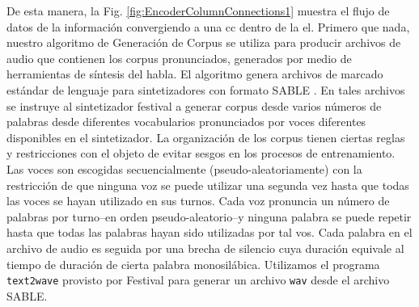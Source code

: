 {De esta manera, la Fig. \ref{fig:EncoderColumnConnections1} muestra el flujo de datos de la información convergiendo a una \gls{cc} dentro de la \gls{el}.
Primero que nada, nuestro algoritmo de Generación de Corpus se utiliza para producir archivos de audio que contienen los corpus pronunciados, generados por medio de herramientas de síntesis del habla.
El algoritmo genera archivos de marcado estándar de lenguaje para sintetizadores con formato SABLE \cite{sable}.
En tales archivos se instruye al sintetizador \gls{festival} a generar corpus desde varios números de palabras desde diferentes vocabularios pronunciados por voces diferentes disponibles en el sintetizador. 
La organización de los corpus tienen ciertas reglas y restricciones con el objeto de evitar sesgos en los procesos de entrenamiento.
Las voces son escogidas secuencialmente (pseudo-aleatoriamente) con la restricción de que ninguna voz se puede utilizar una segunda vez hasta que todas las voces se hayan utilizado en sus turnos.
Cada voz pronuncia un número de palabras por turno--en orden pseudo-aleatorio--y ninguna palabra se puede repetir hasta que todas las palabras hayan sido utilizadas por tal vos.
Cada palabra en el archivo de audio es seguida por una brecha de silencio cuya duración equivale al tiempo de duración de cierta palabra monosilábica.
Utilizamos el programa \texttt{text2wave} provisto por Festival para generar un archivo \texttt{wav} desde el archivo SABLE.

}
